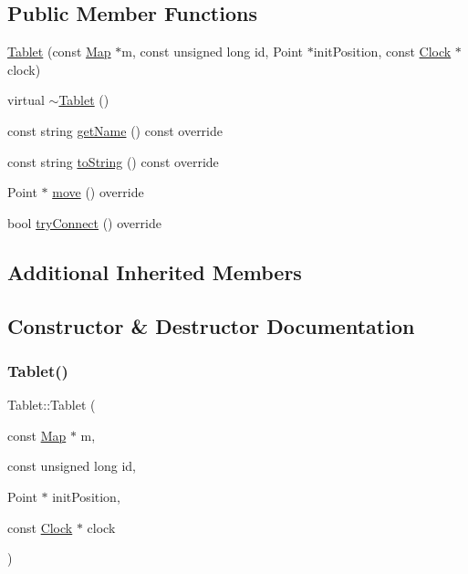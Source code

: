 \subsection*{Public Member Functions}
\begin{DoxyCompactItemize}
\item 
\mbox{\hyperlink{class_tablet_af457c0988b7a768659a284e16be58dc6}{Tablet}} (const \mbox{\hyperlink{class_map}{Map}} $\ast$m, const unsigned long id, Point $\ast$init\+Position, const \mbox{\hyperlink{class_clock}{Clock}} $\ast$clock)
\item 
virtual \mbox{\hyperlink{class_tablet_ac18d46eafd643e66dde81a3fefadab89}{$\sim$\+Tablet}} ()
\item 
const string \mbox{\hyperlink{class_tablet_adc7196aaee1e9714236b7cd8825d5826}{get\+Name}} () const override
\item 
const string \mbox{\hyperlink{class_tablet_a3fae01e7d526699476221c6a686a4fba}{to\+String}} () const override
\item 
Point $\ast$ \mbox{\hyperlink{class_tablet_ab1b8c7591be0c6ea118c8ab1c17839bb}{move}} () override
\item 
bool \mbox{\hyperlink{class_tablet_a2328422e1706dfeb2b51a6960e6879f0}{try\+Connect}} () override
\end{DoxyCompactItemize}
\subsection*{Additional Inherited Members}


\subsection{Constructor \& Destructor Documentation}
\mbox{\label{class_tablet_af457c0988b7a768659a284e16be58dc6}} 
\subsubsection{\texorpdfstring{Tablet()}{Tablet()}}
{\footnotesize\ttfamily Tablet\+::\+Tablet (\begin{DoxyParamCaption}\item[{const \mbox{\hyperlink{class_map}{Map}} $\ast$}]{m,  }\item[{const unsigned long}]{id,  }\item[{Point $\ast$}]{init\+Position,  }\item[{const \mbox{\hyperlink{class_clock}{Clock}} $\ast$}]{clock }\end{DoxyParamCaption})\hspace{0.3cm}{\ttfamily [explicit]}}

